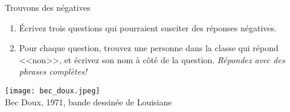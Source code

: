 \begin{frame}{Trouvons des négatives}
  \begin{enumerate}
    \item Écrivez trois questions qui pourraient susciter  des réponses négatives.
    \item<2-> Pour chaque question, trouvez une personne dans la classe qui répond <<non>>, et écrivez son nom à côté de la question. \emph{Répondez avec des phrases complètes!}
  \end{enumerate}
  \begin{center}
    \footnotesize
    \texttt{[image: bec\_doux.jpeg]} \\
    Bec Doux, 1971, bande dessinée de Louisiane
  \end{center}
\end{frame}